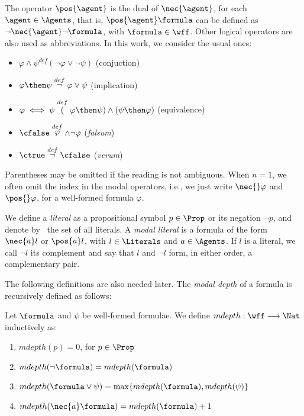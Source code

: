 The operator $\pos{\agent}$ is the dual of $\nec{\agent}$, for each $\agent \in
\Agents$, that is, $\pos{\agent} \formula$ can be defined as $\neg \nec{\agent} \neg
\formula$, with $\formula \in \wff$. Other logical operators are also used as abbreviations.
In this work, we consider the usual ones:
\begin{itemize}
    \item $\varphi \wedge \psi \stackrel{def} \neg(\neg \varphi \lor \neg \psi)$ (conjuction)
    \item $\varphi \then \psi \stackrel{def} \neg \varphi \lor \psi$ (implication)
    \item $\varphi \iff \psi \stackrel{def} (\varphi \then \psi) \land (\psi \then \varphi)$ (equivalence)
    \item $\cfalse \stackrel{def} \varphi \wedge \neg \varphi$ (\emph{falsum})
    \item $\ctrue \stackrel{def} \neg \cfalse$ (\emph{verum}) 
\end{itemize}

Parentheses may be omitted if the reading is not ambiguous.  When $n = 1$, we
often omit the index in the modal operators, i.e., we just write $\nec{}
\varphi$ and $\pos{}\varphi$, for a well-formed formula $\varphi$. 

We define a \emph{literal} as a propositional symbol $p \in \Prop$ or its negation $\neg
p$, and denote by \Literals~the set of all literals. A \emph{modal literal} is a
formula of the form $\nec{a} l$ or $\pos{a} l$, with $l \in \Literals$ and $a
\in \Agents$. If $l$ is a literal, we call $\neg l$ its complement and say that
$l$ and $\neg l$ form, in either order, a complementary pair.

The following definitions are also needed later. The
\emph{modal depth} of a formula is recursively defined as follows:

\begin{definition}
    Let $\formula$ and $\psi$ be well-formed formulae. We define $mdepth : \wff \longrightarrow \Nat$ inductively as:
    \begin{enumerate}
        \item $mdepth(p) = 0$, for $p \in \Prop$ 
        \item $mdepth(\neg \formula) = mdepth(\formula)$
        \item $mdepth(\formula \lor \psi) = \max\{mdepth(\formula), mdepth(\psi)\}$
        \item $mdepth(\nec{a} \formula) = mdepth(\formula) + 1$
    \end{enumerate}
\end{definition}

